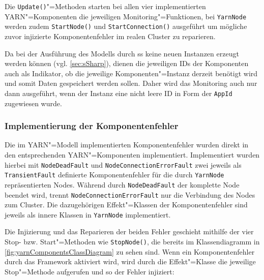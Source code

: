 Die \texttt{Update()}"=Methoden starten bei allen vier implementierten \ac{YARN}"=Komponenten die jeweiligen Monitoring"=Funktionen, bei \texttt{YarnNode} werden zudem \texttt{StartNode()} und \texttt{StartConnection()} ausgeführt um mögliche zuvor injizierte Komponentenfehler im realen Cluster zu reparieren.

Da bei der Ausführung des Modells durch \ac{ss} keine neuen Instanzen erzeugt werden können (vgl. \cref{sec:sSharp}), dienen die jeweiligen IDs der Komponenten auch als Indikator, ob die jeweilige Komponenten"=Instanz derzeit benötigt wird und somit Daten gespeichert werden sollen.
Daher wird das Monitoring auch nur dann ausgeführt, wenn der Instanz eine nicht leere ID \zB in Form der \texttt{AppId} zugewiesen wurde.

\subsubsection{Implementierung der Komponentenfehler}
\label{subsubsec:yarnComponentFaults}

Die im \ac{YARN}"=Modell implementierten Komponentenfehler wurden direkt in den entsprechenden \ac{YARN}"=Komponenten implementiert.
Implementiert wurden hierbei mit \texttt{NodeDeadFault} und \texttt{NodeConnectionErrorFault} zwei jeweils als \texttt{TransientFault} definierte Komponentenfehler für die durch \texttt{YarnNode} repräsentierten Nodes.
Während durch \texttt{NodeDeadFault} der komplette Node beendet wird, trennt \texttt{NodeConnectionErrorFault} nur die Verbindung des Nodes zum Cluster.
Die dazugehörigen Effekt"=Klassen der Komponentenfehler sind jeweils als innere Klassen in \texttt{YarnNode} implementiert.

Die Injizierung und das Reparieren der beiden Fehler geschieht mithilfe der vier Stop- bzw. Start"=Methoden wie \zB \texttt{StopNode()}, die bereits im Klassendiagramm in \cref{fig:yarnComponentsClassDiagram} zu sehen sind.
Wenn ein Komponentenfehler durch das Framework aktiviert wird, wird durch die Effekt"=Klasse die jeweilige Stop"=Methode aufgerufen und so der Fehler injiziert:


